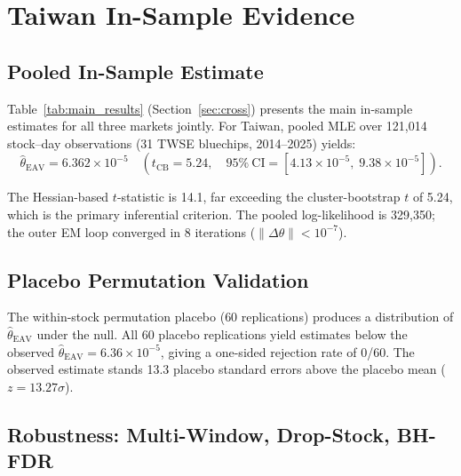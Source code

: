 \documentclass[12pt,a4paper]{article}
\begin{document}
\section{Taiwan In-Sample Evidence}
\label{sec:tw}

\subsection{Pooled In-Sample Estimate}

Table~\ref{tab:main_results} (Section~\ref{sec:cross}) presents the main
in-sample estimates for all three markets jointly. For Taiwan, pooled MLE
over 121,014 stock--day observations (31 TWSE bluechips, 2014--2025)
yields:
%
\[
\hat{\theta}_{\mathrm{EAV}} = 6.362 \times 10^{-5}
\quad (t_{\mathrm{CB}} = 5.24,\quad
 95\%\ \mathrm{CI} = [4.13 \times 10^{-5},\; 9.38 \times 10^{-5}]).
\]

The Hessian-based $t$-statistic is 14.1, far exceeding the
cluster-bootstrap $t$ of 5.24, which is the primary inferential
criterion. The pooled log-likelihood is 329,350; the outer EM loop
converged in 8 iterations ($\|\Delta\theta\| < 10^{-7}$).

\subsection{Placebo Permutation Validation}

The within-stock permutation placebo (60 replications) produces a
distribution of $\hat{\theta}_{\mathrm{EAV}}$ under the null. All 60
placebo replications yield estimates below the observed
$\hat{\theta}_{\mathrm{EAV}} = 6.36 \times 10^{-5}$, giving a one-sided
rejection rate of 0/60.
The observed estimate stands 13.3 placebo standard errors above the
placebo mean ($z = 13.27\sigma$).

\subsection{Robustness: Multi-Window, Drop-Stock, BH-FDR}
\end{document}
